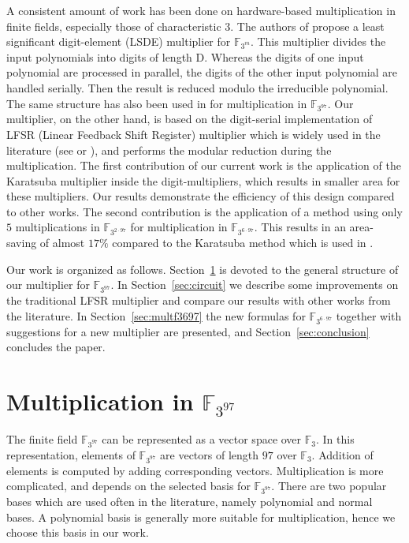 \documentclass{article}
\newcommand{\F}{\mathbb{F}}
\begin{document}
A consistent amount of work has been done on hardware-based
multiplication in finite fields, especially those of characteristic
$3$. The authors of \cite{bergua03} propose a least significant
digit-element (LSDE) multiplier for $\F_{3^{m}}$. 
This multiplier divides the input polynomials into digits of length D. Whereas the digits of one input polynomial are processed in parallel, the digits of the other input polynomial are handled serially. Then the result is reduced modulo the
irreducible polynomial. 
The same structure has also been used in \cite{kermar05} for
multiplication in $\F_{3^{97}}$. 
Our multiplier, on the other hand, is based on the digit-serial
implementation of LFSR (Linear Feedback Shift Register) multiplier
which is widely used in the literature (see \cite{mce87} or
\cite{sho06}), and performs the modular reduction during the multiplication. The first contribution of our current work is
the application of the Karatsuba multiplier inside the
digit-multipliers, which results in smaller area for these
multipliers. 
Our results demonstrate the efficiency of this design compared to other works. 
The second contribution is the application of a method using only $5$
multiplications in $\F_{3^{2 \cdot 97}}$ for multiplication in
$\F_{3^{6 \cdot 97}}$. This results in an area-saving of almost
$17\%$ compared to the Karatsuba method which is used in
\cite{kermar05}.
   
Our work is organized as follows. Section~\ref{sec:multf397} is
devoted to the general structure of our multiplier for $\F_{3^{97}}$. In
Section~\ref{sec:circuit} we describe some improvements on the
traditional LFSR multiplier and compare our results with other works
from the literature. 
In Section~\ref{sec:multf3697} the new formulas for $\F_{3^{6 \cdot
    97}}$ together with suggestions for a new multiplier are
presented, and Section~\ref{sec:conclusion} concludes the paper.

\section{Multiplication in $\F_{3^{97}}$}
\label{sec:multf397}

The finite field $\F_{3^{97}}$ can be represented as a vector space
over $\F_{3}$. In this representation, elements of $\F_{3^{97}}$ are
vectors of length $97$ over $\F_{3}$. Addition of elements is computed
by adding corresponding vectors. Multiplication is more complicated,
and depends on the selected basis for $\F_{3^{97}}$. There are two
popular bases which are used often in the literature, namely
polynomial and normal bases. 
A polynomial basis is generally more suitable for multiplication,
hence we choose this basis in our work. 
\end{document}
